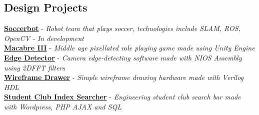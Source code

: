 \documentclass[10pt, a4paper]{cv}
\begin{document}
\subsection*{Design Projects}
\noindent
{}\textbf{\href{http://github.com/utra-robosoccer/soccerbot}{Soccerbot}} - \emph{Robot team that plays soccer, technologies include SLAM, ROS, OpenCV - In development}\\
\textbf{\href{http://vuwij.com/index.php/macabre}{Macabre III}} - \emph{Middle age pixellated role playing game made using Unity Engine}\\
\textbf{\href{https://github.com/lpahlavi/EdgeDetector}{Edge Detector}} - \emph{Camera edge-detecting software made with NIOS Assembly using 2DFFT filters}\\
\textbf{\href{http://vuwij.com/index.php/projects1/80-programming-projects/93-3d-hardware-wireframe-renderer}{Wireframe Drawer}} - \emph{Simple wireframe drawing hardware made with Verilog HDL}\\
\textbf{\href{http://skule.ca/view-clubs/}{Student Club Index Searcher}} - \emph{Engineering student club search bar made with Wordpress, PHP AJAX and SQL}\\
\end{document}
